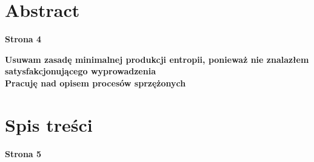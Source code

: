 \documentclass[10pt, a4paper, twoside, onecolumn]{article}
\numberwithin{equation}{section}
\begin{document}
	\section*{Abstract}
	\begin{center}
		\textbf{Strona 4}
	\end{center}
	\textbf{Usuwam zasadę minimalnej produkcji entropii, ponieważ nie znalazłem satysfakcjonującego wyprowadzenia} \\
	\textbf{Pracuję nad opisem procesów sprzężonych}
	\pagebreak
	
	\section*{Spis treści}
	\begin{center}
		\textbf{Strona 5}
	\end{center}
	\tableofcontents
	\pagebreak
	
	
\end{document}
